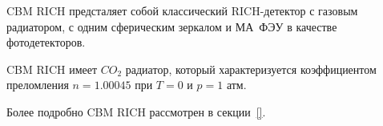 CBM RICH предсталяет собой классический RICH-детектор с газовым радиатором, с одним сферическим зеркалом и МА~ФЭУ в качестве фотодетекторов.

CBM RICH имеет $CO_{2}$ радиатор, который характеризуется коэффициентом преломления $n=1.00045$ при $T=0$ и $p=1$ атм.

Более подробно CBM RICH рассмотрен в секции~\ref{}.

